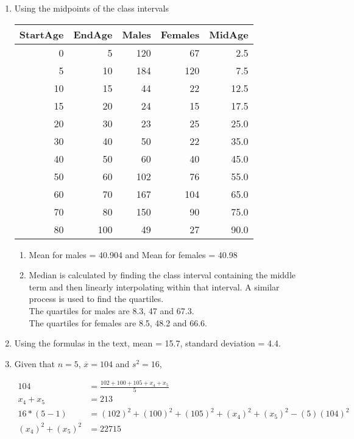 \begin{enumerate}
	\item Using the midpoints of the class intervals
	\begin{table}[H]
		\centering
		\begin{tabular}{rrrrr}
			\toprule
			StartAge &  EndAge &  Males &  Females &  MidAge \\
			\midrule
			0 &       5 &    120 &       67 &     2.5 \\
			5 &      10 &    184 &      120 &     7.5 \\
			10 &      15 &     44 &       22 &    12.5 \\
			15 &      20 &     24 &       15 &    17.5 \\
			20 &      30 &     23 &       25 &    25.0 \\
			30 &      40 &     50 &       22 &    35.0 \\
			40 &      50 &     60 &       40 &    45.0 \\
			50 &      60 &    102 &       76 &    55.0 \\
			60 &      70 &    167 &      104 &    65.0 \\
			70 &      80 &    150 &       90 &    75.0 \\
			80 &     100 &     49 &       27 &    90.0 \\
			\bottomrule
		\end{tabular}
	\end{table}
	
	\begin{enumerate}
		\item Mean for males = 40.904  and Mean for females = 40.98\\
		\item Median is calculated by finding the class interval containing the middle term and then linearly interpolating within that interval. A similar process is used to find the quartiles. \\
		
		The quartiles for males are 8.3, 47 and 67.3. \\
		The quartiles for females are 8.5, 48.2 and 66.6.
	\end{enumerate}
	
	\item Using the formulas in the text, mean =  15.7, standard deviation = 4.4.
	
	\item Given that $ n = 5 $, $ \overline{x} = 104 $ and $ s^2 = 16 $, 
	
	\begin{subequations}
		\begin{align}
			104 &= \frac{ 102 + 100 + 105 + x_{4} + x_{5} }{5} \\
			x_4 + x_5 &= 213 \\
			16 * (5 - 1) &= (102)^2 + (100)^2 + (105)^2 + (x_4)^2 + (x_5)^2  - (5)(104)^2 \\
			(x_4)^2 + (x_5)^2 &= 22715
		\end{align}
		

\end{subequations}
\end{enumerate}
